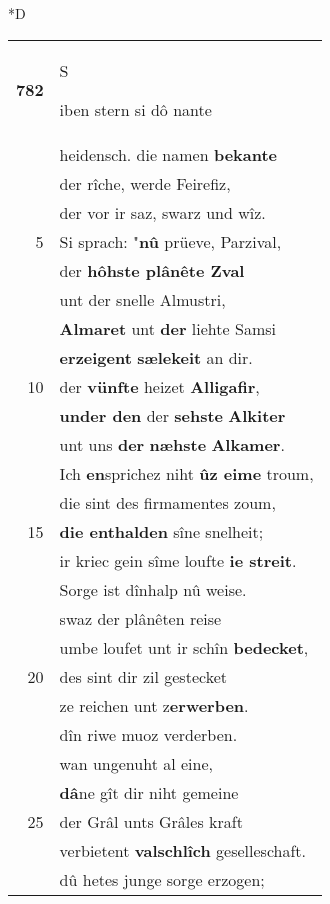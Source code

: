 \documentclass[8pt,a4paper,notitlepage]{article}
\begin{document}
\begin{table}[ht]
\begin{minipage}[t]{0.5\linewidth}
\small
\begin{center}*D
\end{center}
\begin{tabular}{rl}
\textbf{782} & \begin{large}S\end{large}iben stern si dô nante\\ 
 & heidensch. die namen \textbf{bekante}\\ 
 & der rîche, werde Feirefiz,\\ 
 & der vor ir saz, swarz und wîz.\\ 
5 & Si sprach: "\textbf{nû} prüeve, Parzival,\\ 
 & der \textbf{hôhste plânête Zval}\\ 
 & unt der snelle Almustri,\\ 
 & \textbf{Almaret} unt \textbf{der} liehte Samsi\\ 
 & \textbf{erzeigent} \textbf{sælekeit} an dir.\\ 
10 & der \textbf{vünfte} heizet \textbf{Alligafir},\\ 
 & \textbf{under den} der \textbf{sehste} \textbf{Alkiter}\\ 
 & unt uns \textbf{der} \textbf{næhste} \textbf{Alkamer}.\\ 
 & Ich \textbf{en}sprichez niht \textbf{ûz eime} troum,\\ 
 & die sint des firmamentes zoum,\\ 
15 & \textbf{die enthalden} sîne snelheit;\\ 
 & ir kriec gein sîme loufte \textbf{ie streit}.\\ 
 & Sorge ist dînhalp nû weise.\\ 
 & swaz der plânêten reise\\ 
 & umbe loufet unt ir schîn \textbf{bedecket},\\ 
20 & des sint dir zil gestecket\\ 
 & ze reichen unt z\textbf{erwerben}.\\ 
 & dîn riwe muoz verderben.\\ 
 & wan ungenuht al eine,\\ 
 & \textbf{dâ}ne gît dir niht gemeine\\ 
25 & der Grâl unts Grâles kraft\\ 
 & verbietent \textbf{valschlîch} geselleschaft.\\ 
 & dû hetes junge sorge erzogen;\\ 

\end{tabular}
\end{minipage}
\end{table}
\end{document}
